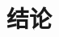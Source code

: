 \documentclass[journal,transmag]{IEEEtran}
\begin{document}
\section{结论}



%
%



%
%
\end{document}
